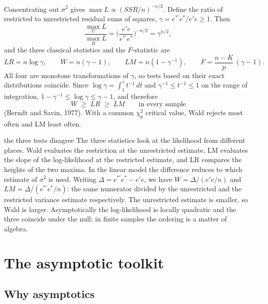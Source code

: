 \documentclass[11pt,a4paper]{article}
\begin{document}
Concentrating out $\sigma^2$ gives $\max L\propto(SSR/n)^{-n/2}$. Define the ratio of restricted to unrestricted residual sums of squares, $\gamma = e^{*\prime}e^*/e'e\geq1$. Then
\[
\frac{\max_U L}{\max_R L}=\Big(\frac{e'e}{e^{*\prime}e^*}\Big)^{-n/2}=\gamma^{n/2},
\]
and the three classical statistics and the $F$-statistic are
\begin{equation}\label{eq:trinity}
LR = n\log\gamma,\qquad W = n(\gamma-1),\qquad LM = n(1-\gamma^{-1}),\qquad F=\frac{n-K}{p}\,(\gamma-1).
\end{equation}
All four are monotone transformations of $\gamma$, so tests based on their exact distributions coincide. Since $\log\gamma=\int_1^\gamma t^{-1}\,dt$ and $\gamma^{-1}\leq t^{-1}\leq1$ on the range of integration, $1-\gamma^{-1}\leq\log\gamma\leq\gamma-1$, and therefore
\[
W\;\geq\;LR\;\geq\;LM\qquad\text{in every sample}
\]
(Berndt and Savin, 1977). With a common $\chi^2_p$ critical value, Wald rejects most often and LM least often.

\begin{whybox}{the three tests disagree}
The three statistics look at the likelihood from different places. Wald evaluates the restriction at the unrestricted estimate, LM evaluates the slope of the log-likelihood at the restricted estimate, and LR compares the heights of the two maxima. In the linear model the difference reduces to which estimate of $\sigma^2$ is used. Writing $\Delta=e^{*\prime}e^*-e'e$, we have $W=\Delta/(e'e/n)$ and $LM=\Delta/(e^{*\prime}e^*/n)$: the same numerator divided by the unrestricted and the restricted variance estimate respectively. The unrestricted estimate is smaller, so Wald is larger. Asymptotically the log-likelihood is locally quadratic and the three coincide under the null; in finite samples the ordering is a matter of algebra.
\end{whybox}

\section{The asymptotic toolkit}\label{sec:asy}

\subsection{Why asymptotics}
\end{document}
